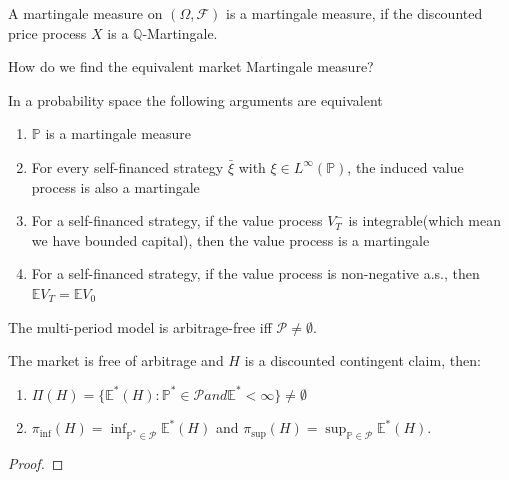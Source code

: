 \begin{definition}
	A martingale measure on $(\Omega, \mathcal{F})$ is a martingale measure, if the discounted price process $X$ is a $\mathbb{Q}$-Martingale.  
\end{definition}

How do we find the equivalent market Martingale measure?

\begin{theorem}
	In a probability space the following arguments are equivalent
	\begin{enumerate}
		\item $\mathbb{P}$ is a martingale measure
		\item For every self-financed strategy $\bar{\xi}$ with $\xi \in L^\infty(\mathbb{P})$, the induced value process is also a martingale
		\item For a self-financed strategy, if the value process $V^-_T$ is integrable(which mean we have bounded capital), then the value process is a martingale
		\item For a self-financed strategy, if the value process is non-negative a.s., then $\mathbb{E}V_T = \mathbb{E}V_0$
	\end{enumerate}
\end{theorem}

\begin{theorem}
The multi-period model is arbitrage-free iff $\mathcal{P} \neq \emptyset$.
\end{theorem}
 
\begin{definition}
\end{definition}

\begin{theorem}
The market is free of arbitrage and $H$ is a discounted contingent claim, then:
\begin{enumerate}
	\item $\Pi(H) = \{ \mathbb{E}^*(H): \mathbb{P}^* \in \mathcal{P} and \mathbb{E}^* < \infty \} \neq \emptyset$
	\item $\pi_{\inf}(H) = \inf_{\mathbb{P}^* \in \mathcal{P}} \mathbb{E}^*(H)$ and $\pi_{\sup}(H) = \sup_{\mathbb{P} \in \mathcal{P}} \mathbb{E}^*(H)$.
\end{enumerate}
\end{theorem}
\begin{proof}
\end{proof}

